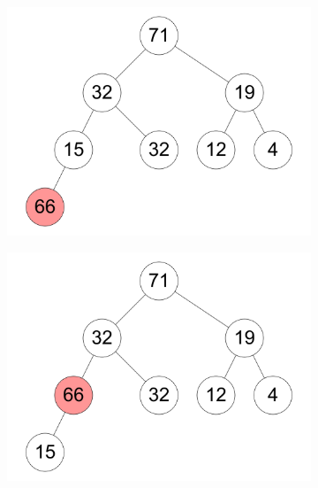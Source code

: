 \documentclass[11pt,a4paper]{article}
\begin{document}
\begin{loesung}
\begin{enumerate}
\begin{figure}[h!]
\begin{subfigure}[b]{0.23\textwidth}
                \includegraphics[width=\textwidth]{img/d5}
            \end{subfigure}
            \begin{subfigure}[b]{0.23\textwidth}
                \centering
                \includegraphics[width=\textwidth]{img/d6}
            \end{subfigure}
            \begin{subfigure}[b]{0.23\textwidth}
                \centering

\end{subfigure}
\end{figure}
\end{enumerate}
\end{loesung}
\end{document}

